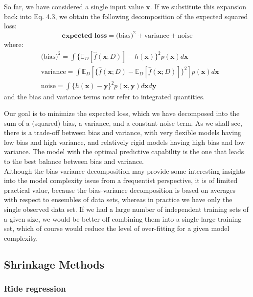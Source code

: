 \documentclass[twoside]{article}
\begin{document}
So far, we have considered a single input value $\boldsymbol{x}$. If we substitute this expansion back into Eq. 4.3, we obtain the following decomposition of the expected squared loss:
\begin{equation*}
    \textbf{expected loss} = \text{(bias)}^2 + \text{variance} + \text{noise}
\end{equation*}
where:
\begin{equation*}
\begin{aligned}
    &\text{(bias)}^2 = \int \{\mathbb{E}_D[\hat{f}(\boldsymbol{x}; D)] - h(\boldsymbol{x})\}^2 p(\boldsymbol{x})d\boldsymbol{x}\\
    &\text{variance} = \int \mathbb{E}_D[\{\hat{f}(\boldsymbol{x}; D) - \mathbb{E}_D[\hat{f}(\boldsymbol{x}; D)]\}^2] p(\boldsymbol{x})d\boldsymbol{x}\\
    &\text{noise} = \int\{ h(\boldsymbol{x}) - \boldsymbol{y}\}^2p(\boldsymbol{x}, \boldsymbol{y})d\boldsymbol{x}d\boldsymbol{y}
\end{aligned}
\end{equation*}
and the bias and variance terms now refer to integrated quantities.\medskip

Our goal is to minimize the expected loss, which we have decomposed into the sum of a (squared) bias, a variance, and a constant noise term. As we shall see, there is a trade-off between bias and variance, with very flexible models having low bias and high variance, and relatively rigid models having high bias and low variance. The model with the optimal predictive capability is the one that leads to the best balance between bias and variance.\\
Although the bias-variance decomposition may provide some interesting insights into the model complexity issue from a frequentist perspective, it is of limited practical value, because the bias-variance decomposition is based on averages with respect to ensembles of data sets, whereas in practice we have only the single observed data set. If we had a large number of independent training sets of a given size, we would be better off combining them into a single large training set, which of course would reduce the level of over-fitting for a given model complexity.

\subsection{Shrinkage Methods}

\subsubsection{Ride regression}
\end{document}
